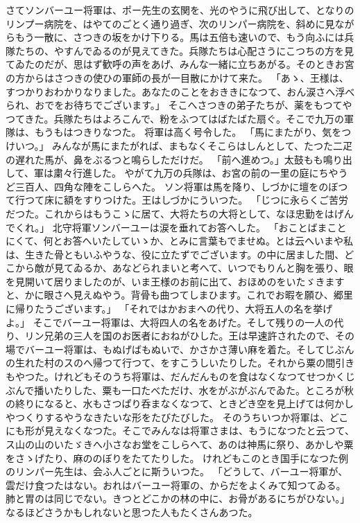 \documentclass[a4paper,
tate,
book]
{jlreq}
\begin{document}
  さてソンバーユー将軍は、ポー先生の玄関を、光のやうに飛び出して、となりのリンプー病院を、はやてのごとく通り過ぎ、次のリンパー病院を、斜めに見ながらもう一散に、さつきの坂をかけ下りる。馬は五倍も速いので、もう向ふには兵隊たちの、やすんでゐるのが見えてきた。兵隊たちは心配さうにこつちの方を見てゐたのだが、思はず歓呼の声をあげ、みんな一緒に立ちあがる。そのときお宮の方からはさつきの使ひの軍師の長が一目散にかけて来た。
「あゝ、王様は、すつかりおわかりなりました。あなたのことをおききになつて、おん涙さへ浮べられ、おでをお待ちでございます。」
  そこへさつきの弟子たちが、薬をもつてやつてきた。兵隊たちはよろこんで、粉をふつてはばたばた扇ぐ。そこで九万の軍隊は、もうもはつきりなつた。
  将軍は高く号令した。
「馬にまたがり、気をつけいつ。」
  みんなが馬にまたがれば、まもなくそこらはしんとして、たつた二疋の遅れた馬が、鼻をぶるつと鳴らしただけだ。
「前へ進めつ。」太鼓もも鳴り出して、軍は粛々行進した。
  やがて九万の兵隊は、お宮の前の一里の庭にちやうど三百人、四角な陣をこしらへた。
  ソン将軍は馬を降り、しづかに壇をのぼつて行つて床に額をすりつけた。王はしづかにういつた。
「じつに永らくご苦労だつた。これからはもうこゝに居て、大将たちの大将として、なほ忠勤をはげんでくれ。」
  北守将軍ソンバーユーは涙を垂れてお答へした。
「おことばまことにくて、何とお答へいたしていゝか、とみに言葉もでませぬ。とは云へいまや私は、生きた骨ともいふやうな、役に立たずでございます。の中に居ました間、どこから敵が見てゐるか、あなどられまいと考へて、いつでもりんと胸を張り、眼を見開いて居りましたのが、いま王様のお前に出て、おほめのをいたゞきますと、かに眼さへ見えぬやう。背骨も曲つてしまひます。これでお暇を願ひ、郷里に帰りたうございます。」
「それではかおまへの代り、大将五人の名を挙げよ。」
  そこでバーユー将軍は、大将四人の名をあげた。そして残りの一人の代り、リン兄弟の三人を国のお医者におねがひした。王は早速許されたので、その場でバーユー将軍は、もぬげばもぬいで、かさかさ薄い麻を着た。そしてじぶんの生れた村のスのへ帰つて行つて、をすこうしいたりした。それから粟の間引きもやつた。けれどもそのうち将軍は、だんだんものを食はなくなつてせつかくじぶんで播いたりした、粟も一口たべただけ、水をがぶがぶんでゐた。ところが秋の終りになると、水もさつぱり呑まなくなつて、ときどき空を見上げては何かしやつくりするやうなきたいな形をたびたびした。
  そのうちいつか将軍は、どこにも形が見えなくなつた。そこでみんなは将軍さまは、もうになつたと云つて、ス山の山のいたゞきへ小さなお堂をこしらへて、あのは神馬に祭り、あかしや粟をさゝげたり、麻ののぼりをたてたりした。
  けれどもこのとき国手になつた例のリンパー先生は、会ふ人ごとに斯ういつた。
「どうして、バーユー将軍が、雲だけ食つたはない。おれはバーユー将軍の、からだをよくみて知つてゐる。肺と胃のは同じでない。きつとどこかの林の中に、お骨があるにちがひない。」なるほどさうかもしれないと思つた人もたくさんあつた。
\end{document}
